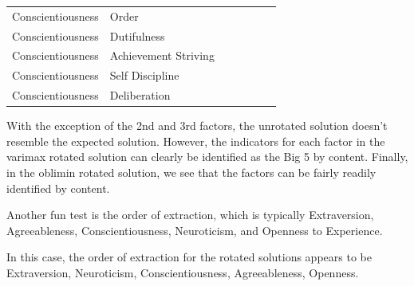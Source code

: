 \documentclass{article}\usepackage[]{graphicx}\usepackage[]{color}
\begin{document}
\begin{table}
\begin{tabular}[t]{lllllll}
Conscientiousness & Order & \cellcolor{white}{0} & \cellcolor{yellow}{0.65} & \cellcolor{white}{0.02} & \cellcolor{white}{0.05} & \cellcolor{white}{-0.21}\\
Conscientiousness & Dutifulness & \cellcolor{white}{0.21} & \cellcolor{yellow}{0.75} & \cellcolor{white}{-0.01} & \cellcolor{white}{0.08} & \cellcolor{white}{-0.08}\\
Conscientiousness & Achievement Striving & \cellcolor{white}{0.23} & \cellcolor{yellow}{0.8} & \cellcolor{white}{-0.01} & \cellcolor{white}{-0.14} & \cellcolor{white}{0}\\
Conscientiousness & Self Discipline & \cellcolor{white}{0.16} & \cellcolor{yellow}{0.84} & \cellcolor{white}{-0.17} & \cellcolor{white}{0.1} & \cellcolor{white}{-0.04}\\
Conscientiousness & Deliberation & \cellcolor{white}{-0.05} & \cellcolor{yellow}{0.65} & \cellcolor{white}{-0.01} & \cellcolor{white}{0.29} & \cellcolor{white}{-0.05}\\
\bottomrule
\end{tabular}
\end{table}



With the exception of the 2nd and 3rd factors, the unrotated solution doesn't resemble the expected solution. However, the indicators for each factor in the varimax rotated solution can clearly be identified as the Big 5 by content. Finally, in the oblimin rotated solution, we see that the factors can be fairly readily identified by content.  

Another fun test is the order of extraction, which is typically Extraversion, Agreeableness, Conscientiousness, Neuroticism, and Openness to Experience.  

In this case, the order of extraction for the rotated solutions appears to be Extraversion, Neuroticism, Conscientiousness, Agreeableness, Openness. 
\end{document}
